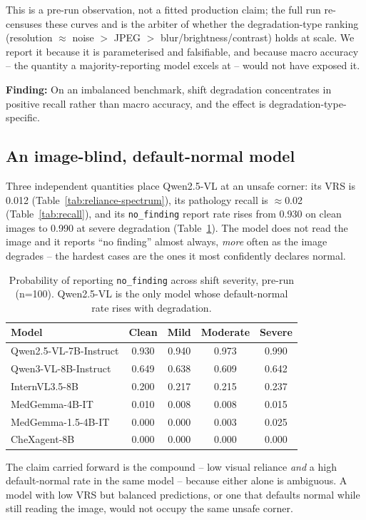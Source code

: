 This is a pre-run observation, not a fitted production claim; the full run
re-censuses these curves and is the arbiter of whether the degradation-type
ranking (resolution $\approx$ noise $>$ JPEG $>$ blur/brightness/contrast)
holds at scale. We report it because it is parameterised and falsifiable, and
because macro accuracy -- the quantity a majority-reporting model excels at --
would not have exposed it.

\textbf{Finding:} On an imbalanced benchmark, shift degradation concentrates in
positive recall rather than macro accuracy, and the effect is
degradation-type-specific.

\subsection{An image-blind, default-normal model}

Three independent quantities place Qwen2.5-VL at an unsafe corner: its VRS is
0.012 (Table~\ref{tab:reliance-spectrum}), its pathology recall is $\approx$0.02
(Table~\ref{tab:recall}), and its \texttt{no\_finding} report rate rises from 0.930
on clean images to 0.990 at severe degradation (Table~\ref{tab:nofind}). The model
does not read the image and it reports ``no finding'' almost always, \emph{more}
often as the image degrades -- the hardest cases are the ones it most confidently
declares normal.

\begin{table}[t]
\centering
\small
\begin{tabular}{lcccc}
\hline
Model & Clean & Mild & Moderate & Severe \\
\hline
Qwen2.5-VL-7B-Instruct & 0.930 & 0.940 & 0.973 & 0.990 \\
Qwen3-VL-8B-Instruct & 0.649 & 0.638 & 0.609 & 0.642 \\
InternVL3.5-8B & 0.200 & 0.217 & 0.215 & 0.237 \\
MedGemma-4B-IT & 0.010 & 0.008 & 0.008 & 0.015 \\
MedGemma-1.5-4B-IT & 0.000 & 0.000 & 0.003 & 0.025 \\
CheXagent-8B & 0.000 & 0.000 & 0.000 & 0.000 \\
\hline
\end{tabular}
\caption{Probability of reporting \texttt{no\_finding} across shift severity,
pre-run (n=100). Qwen2.5-VL is the only model whose default-normal rate rises with
degradation.}
\label{tab:nofind}
\end{table}

The claim carried forward is the compound -- low visual reliance \emph{and} a
high default-normal rate in the same model -- because either alone is ambiguous.
A model with low VRS but balanced predictions, or one that defaults normal while
still reading the image, would not occupy the same unsafe corner.

